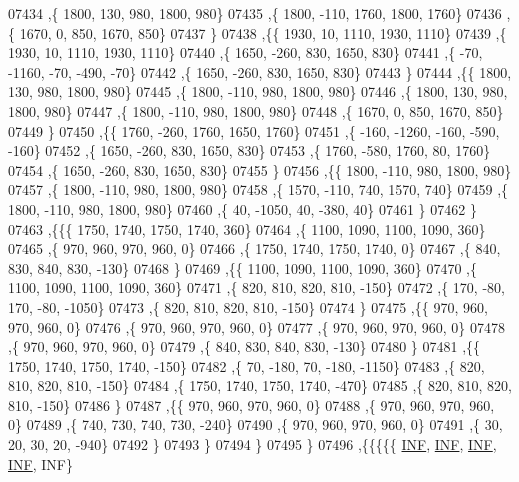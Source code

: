 \begin{DoxyCode}
07434     ,\{  1800,   130,   980,  1800,   980\}
07435     ,\{  1800,  -110,  1760,  1800,  1760\}
07436     ,\{  1670,     0,   850,  1670,   850\}
07437     \}
07438    ,\{\{  1930,    10,  1110,  1930,  1110\}
07439     ,\{  1930,    10,  1110,  1930,  1110\}
07440     ,\{  1650,  -260,   830,  1650,   830\}
07441     ,\{   -70, -1160,   -70,  -490,   -70\}
07442     ,\{  1650,  -260,   830,  1650,   830\}
07443     \}
07444    ,\{\{  1800,   130,   980,  1800,   980\}
07445     ,\{  1800,  -110,   980,  1800,   980\}
07446     ,\{  1800,   130,   980,  1800,   980\}
07447     ,\{  1800,  -110,   980,  1800,   980\}
07448     ,\{  1670,     0,   850,  1670,   850\}
07449     \}
07450    ,\{\{  1760,  -260,  1760,  1650,  1760\}
07451     ,\{  -160, -1260,  -160,  -590,  -160\}
07452     ,\{  1650,  -260,   830,  1650,   830\}
07453     ,\{  1760,  -580,  1760,    80,  1760\}
07454     ,\{  1650,  -260,   830,  1650,   830\}
07455     \}
07456    ,\{\{  1800,  -110,   980,  1800,   980\}
07457     ,\{  1800,  -110,   980,  1800,   980\}
07458     ,\{  1570,  -110,   740,  1570,   740\}
07459     ,\{  1800,  -110,   980,  1800,   980\}
07460     ,\{    40, -1050,    40,  -380,    40\}
07461     \}
07462    \}
07463   ,\{\{\{  1750,  1740,  1750,  1740,   360\}
07464     ,\{  1100,  1090,  1100,  1090,   360\}
07465     ,\{   970,   960,   970,   960,     0\}
07466     ,\{  1750,  1740,  1750,  1740,     0\}
07467     ,\{   840,   830,   840,   830,  -130\}
07468     \}
07469    ,\{\{  1100,  1090,  1100,  1090,   360\}
07470     ,\{  1100,  1090,  1100,  1090,   360\}
07471     ,\{   820,   810,   820,   810,  -150\}
07472     ,\{   170,   -80,   170,   -80, -1050\}
07473     ,\{   820,   810,   820,   810,  -150\}
07474     \}
07475    ,\{\{   970,   960,   970,   960,     0\}
07476     ,\{   970,   960,   970,   960,     0\}
07477     ,\{   970,   960,   970,   960,     0\}
07478     ,\{   970,   960,   970,   960,     0\}
07479     ,\{   840,   830,   840,   830,  -130\}
07480     \}
07481    ,\{\{  1750,  1740,  1750,  1740,  -150\}
07482     ,\{    70,  -180,    70,  -180, -1150\}
07483     ,\{   820,   810,   820,   810,  -150\}
07484     ,\{  1750,  1740,  1750,  1740,  -470\}
07485     ,\{   820,   810,   820,   810,  -150\}
07486     \}
07487    ,\{\{   970,   960,   970,   960,     0\}
07488     ,\{   970,   960,   970,   960,     0\}
07489     ,\{   740,   730,   740,   730,  -240\}
07490     ,\{   970,   960,   970,   960,     0\}
07491     ,\{    30,    20,    30,    20,  -940\}
07492     \}
07493    \}
07494   \}
07495  \}
07496 ,\{\{\{\{\{   \hyperlink{constants_8h_a12c2040f25d8e3a7b9e1c2024c618cb6}{INF},   \hyperlink{constants_8h_a12c2040f25d8e3a7b9e1c2024c618cb6}{INF},   \hyperlink{constants_8h_a12c2040f25d8e3a7b9e1c2024c618cb6}{INF},   \hyperlink{constants_8h_a12c2040f25d8e3a7b9e1c2024c618cb6}{INF},   INF\}

\end{DoxyCode}
